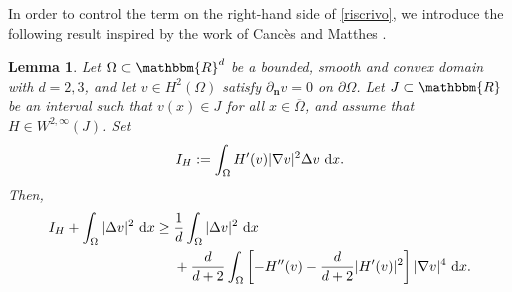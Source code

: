 \documentclass[11pt,  reqno]{amsart}%
\theoremstyle{plain}
\newtheorem{lemma}[theorem]{Lemma}
\theoremstyle{definition}
\theoremstyle{remark}
\numberwithin{equation}{section}
\newcommand{\dx}{\textup{d}x}
\begin{document}
In order to control the term on the right-hand side of \eqref{riscrivo}, we introduce the following result inspired by the work of Canc{\`e}s and Matthes \cite{CM2023}.
\begin{lemma}
\label{refined-lemma}
Let $\Omega\subset\mathbbm{R}^d$ be a bounded, smooth and convex domain with $d=2,3$, and let $v\in H^2(\Omega)$ satisfy $\partial_\mathbf{n} v=0$ on $\partial \Omega$.
Let $J\subset\mathbbm{R}$ be an interval such that $v(x)\in J$ for all
$x\in\overline{\Omega}$, and assume that $H\in W^{2,\infty}(J)$. Set
\[
    I_H
    :=
    \int_\Omega H'(v)|\nabla v|^2\Delta v \ \dx.
\]
Then,
\begin{align}
    I_H+\int_\Omega|\Delta v|^2\ \dx
    \geq{}&
    \frac1d\int_\Omega|\Delta v|^2\ \dx
    \nonumber\\
    &+
    \frac{d}{d+2}
    \int_\Omega
    \left[
        -H''(v)
        -
        \frac{d}{d+2}|H'(v)|^2
    \right]
    |\nabla v|^4\ \dx.
\label{eq:refined-lemma}
\end{align}
\end{lemma}
\end{document}
